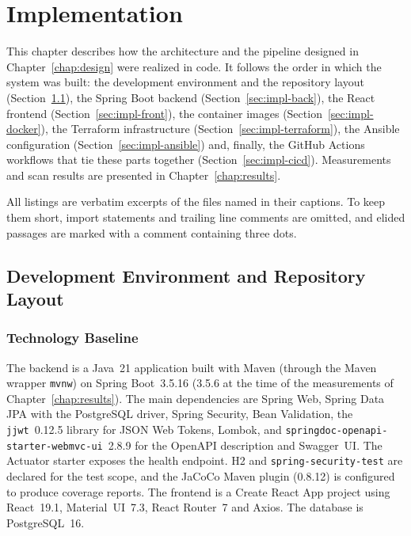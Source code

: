 \chapter{Implementation}\label{chap:implementation}
\label{ch:implementation}

This chapter describes how the architecture and the pipeline designed in Chapter~\ref{chap:design} were realized in code. It follows the order in which the system was built: the development environment and the repository layout (Section~\ref{sec:impl-env}), the Spring Boot backend (Section~\ref{sec:impl-back}), the React frontend (Section~\ref{sec:impl-front}), the container images (Section~\ref{sec:impl-docker}), the Terraform infrastructure (Section~\ref{sec:impl-terraform}), the Ansible configuration (Section~\ref{sec:impl-ansible}) and, finally, the GitHub Actions workflows that tie these parts together (Section~\ref{sec:impl-cicd}). Measurements and scan results are presented in Chapter~\ref{chap:results}.

All listings are verbatim excerpts of the files named in their captions. To keep them short, import statements and trailing line comments are omitted, and elided passages are marked with a comment containing three dots.

\section{Development Environment and Repository Layout}
\label{sec:impl-env}

\subsection{Technology Baseline}

The backend is a Java~21 application built with Maven (through the Maven wrapper \texttt{mvnw}) on Spring Boot~3.5.16 (3.5.6 at the time of the measurements of Chapter~\ref{chap:results}). The main dependencies are Spring Web, Spring Data JPA with the PostgreSQL driver, Spring Security, Bean Validation, the \texttt{jjwt}~0.12.5 library for JSON Web Tokens, Lombok, and \texttt{springdoc-openapi-starter-webmvc-ui}~2.8.9 for the OpenAPI description and Swagger~UI. The Actuator starter exposes the health endpoint. H2 and \texttt{spring-security-test} are declared for the test scope, and the JaCoCo Maven plugin (0.8.12) is configured to produce coverage reports. The frontend is a Create React App project using React~19.1, Material~UI~7.3, React Router~7 and Axios. The database is PostgreSQL~16.

